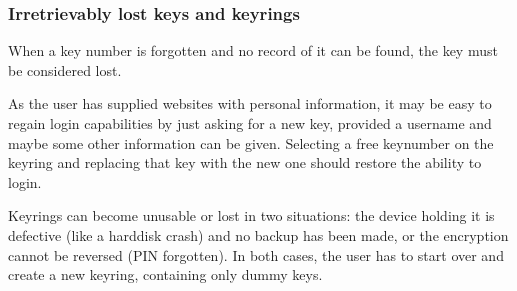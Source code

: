 \subsubsection{Irretrievably lost keys and keyrings}
When a key number is forgotten and no record of it can be found,
the key must be considered lost.
\par
As the user has supplied websites with personal information,
it may be easy to regain login capabilities by just asking for a new key,
provided a username and maybe some other information can be given.
Selecting a free keynumber on the keyring and replacing that key with the new one should restore the ability to login.
\par
Keyrings can become unusable or lost in two situations:
the device holding it is defective (like a harddisk crash) and no backup has been made,
or the encryption cannot be reversed (PIN forgotten).
In both cases, the user has to start over and create a new keyring, containing only dummy keys.
\clearpage
